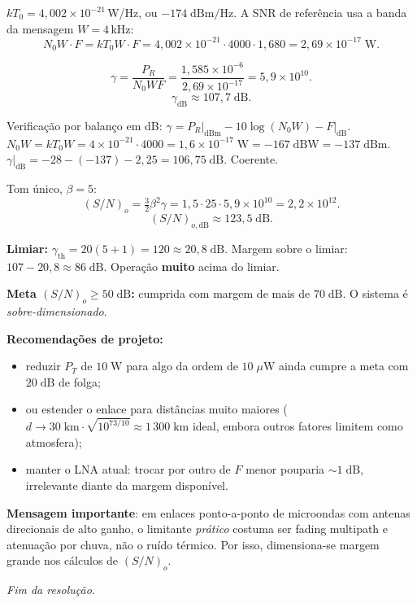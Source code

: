 \documentclass[11pt,a4paper]{article}
\begin{document}
\begin{resolucao}

$kT_0 = 4{,}002\times 10^{-21}$\,W/Hz, ou $-174\;\text{dBm/Hz}$. A SNR de referência usa a banda da mensagem $W = 4$\,kHz:
\[
  N_0 W \cdot F = k T_0 W \cdot F = 4{,}002\times 10^{-21} \cdot 4000 \cdot 1{,}680 = 2{,}69\times 10^{-17}\;\text{W}.
\]

\[
  \gamma = \frac{P_R}{N_0 W F} = \frac{1{,}585\times 10^{-6}}{2{,}69\times 10^{-17}} = 5{,}9\times 10^{10}.
\]
\[
  \boxed{\gamma_{\text{dB}} \approx 107{,}7\;\text{dB}.}
\]

Verificação por balanço em dB: $\gamma = P_R\big|_{\text{dBm}} - 10\log(N_0 W) - F\big|_{\text{dB}}$. \\
$N_0 W = kT_0 W = 4 \times 10^{-21} \cdot 4000 = 1{,}6 \times 10^{-17}\;\text{W} = -167\;\text{dBW} = -137\;\text{dBm}$.\\
$\gamma\big|_{\text{dB}} = -28 - (-137) - 2{,}25 = 106{,}75\;\text{dB}$. Coerente.
\end{resolucao}

\begin{resolucao}

Tom único, $\beta = 5$:
\[
  (S/N)_o = \tfrac{3}{2}\beta^2 \gamma = 1{,}5 \cdot 25 \cdot 5{,}9\times 10^{10} = 2{,}2\times 10^{12}.
\]
\[
  (S/N)_{o,\text{dB}} \approx 123{,}5\;\text{dB}.
\]

\textbf{Limiar:} $\gamma_{\text{th}} = 20(5 + 1) = 120 \approx 20{,}8\;\text{dB}$. Margem sobre o limiar: $107 - 20{,}8 \approx 86\;\text{dB}$. Operação \textbf{muito} acima do limiar.

\textbf{Meta $(S/N)_o \ge 50\;\text{dB}$:} cumprida com margem de mais de $70\;\text{dB}$. O sistema é \emph{sobre-dimensionado}.

\textbf{Recomendações de projeto:}
\begin{itemize}\itemsep0pt
  \item reduzir $P_T$ de $10\;\text{W}$ para algo da ordem de $10\;\mu\text{W}$ ainda cumpre a meta com $20\;\text{dB}$ de folga;
  \item ou estender o enlace para distâncias muito maiores ($d \to 30\;\text{km}\cdot \sqrt{10^{73/10}} \approx 1\,300\;\text{km}$ ideal, embora outros fatores limitem como atmosfera);
  \item manter o LNA atual: trocar por outro de $F$ menor pouparia $\sim 1\;\text{dB}$, irrelevante diante da margem disponível.
\end{itemize}

\textbf{Mensagem importante}: em enlaces ponto-a-ponto de microondas com antenas direcionais de alto ganho, o limitante \emph{prático} costuma ser fading multipath e atenuação por chuva, não o ruído térmico. Por isso, dimensiona-se margem grande nos cálculos de $(S/N)_o$.
\end{resolucao}

\vfill
\begin{center}
  \small\textit{Fim da resolução.}
\end{center}
\end{document}
